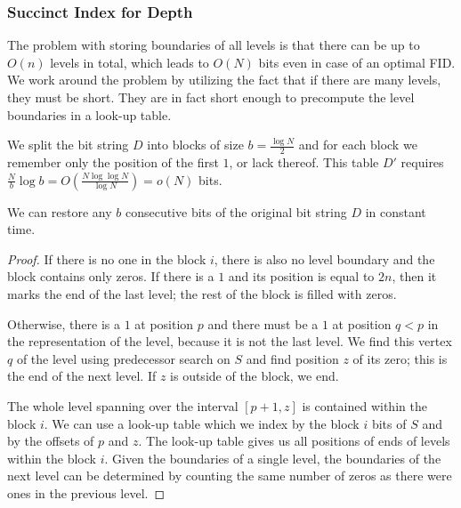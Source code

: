 \begin{algorithmic}
	\State {}
\EndFunction
\end{algorithmic}

\subsubsection{Succinct Index for Depth}\label{ss:louds-depth}

The problem with storing boundaries of all levels is that there can be up to $O(n)$ levels in total, which leads to $O(N)$ bits even in case of an optimal FID.
We work around the problem by utilizing the fact that if there are many levels, they must be short.
They are in fact short enough to precompute the level boundaries in a look-up table.

We split the bit string $D$ into blocks of size $b = \frac{\log N}{2}$ and for each block we remember only the position of the first $1$, or lack thereof.
This table $D'$ requires $\frac{N}{b} \log b = O(\frac{N \log\log N}{\log N}) = o(N)$ bits.

\begin{lemma}
	We can restore any $b$ consecutive bits of the original bit string $D$ in constant time.
\end{lemma}
\begin{proof}
	If there is no one in the block $i$, there is also no level boundary and the block contains only zeros.
	If there is a $1$ and its position is equal to $2n$, then it marks the end of the last level; the rest of the block is filled with zeros.

	Otherwise, there is a $1$ at position $p$ and there must be a $1$ at position $q < p$ in the representation of the level, because it is not the last level.
	We find this vertex $q$ of the level using predecessor search on $S$ and find position $z$ of its zero; this is the end of the next level.
	If $z$ is outside of the block, we end.
	
	The whole level spanning over the interval $[p + 1, z]$ is contained within the block $i$.
	We can use a look-up table \blockOfD{} which we index by the block $i$ bits of $S$ and by the offsets of $p$ and $z$.
	The look-up table gives us all positions of ends of levels within the block $i$.
	Given the boundaries of a single level, the boundaries of the next level can be determined by counting the same number of zeros as there were ones in the previous level.
\end{proof}

